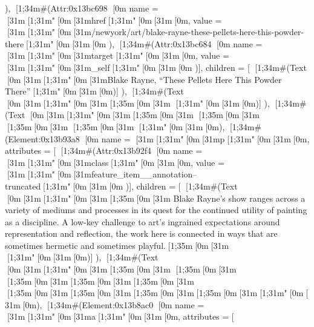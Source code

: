 {{{{{{{                          }),
                        [1;34m#(Attr:0x13bc698 {[0m
                          name = [31m[1;31m"[0m[31mhref[1;31m"[0m[31m[0m,
                          value = [31m[1;31m"[0m[31m/newyork/art/blake-rayne-these-pellets-here-this-powder-there[1;31m"[0m[31m[0m
                          }),
                        [1;34m#(Attr:0x13bc684 {[0m name = [31m[1;31m"[0m[31mtarget[1;31m"[0m[31m[0m, value = [31m[1;31m"[0m[31m_self[1;31m"[0m[31m[0m })],
                      children = [ [1;34m#(Text [0m[31m[1;31m"[0m[31mBlake Rayne, “These Pellets Here This Powder There”[1;31m"[0m[31m[0m)]
                      }),
                    [1;34m#(Text [0m[31m[1;31m"[0m[31m[1;35m\n[0m[31m                                        [1;31m"[0m[31m[0m)]
                  }),
                [1;34m#(Text [0m[31m[1;31m"[0m[31m[1;35m\n[0m[31m                [1;35m\n[0m[31m                                                                    [1;35m\n[0m[31m                                                [1;35m\n[0m[31m                                                                            [1;31m"[0m[31m[0m),
                [1;34m#(Element:0x13b93a8 {[0m
                  name = [31m[1;31m"[0m[31mp[1;31m"[0m[31m[0m,
                  attributes = [
                    [1;34m#(Attr:0x13b92f4 {[0m
                      name = [31m[1;31m"[0m[31mclass[1;31m"[0m[31m[0m,
                      value = [31m[1;31m"[0m[31mfeature_item__annotation--truncated[1;31m"[0m[31m[0m
                      })],
                  children = [
                    [1;34m#(Text [0m[31m[1;31m"[0m[31m[1;35m\n[0m[31m                            Blake Rayne’s show ranges across a variety of mediums and processes in its quest for the continued utility of painting as a discipline. A low-key challenge to art’s ingrained expectations around representation and reflection, the work here is connected in ways that are sometimes hermetic and sometimes playful.[1;35m\n[0m[31m                        [1;31m"[0m[31m[0m)]
                  }),
                [1;34m#(Text [0m[31m[1;31m"[0m[31m[1;35m\n[0m[31m                                    [1;35m\n[0m[31m                [1;35m\t[0m[31m[1;35m\t[0m[31m[1;35m\t[0m[31m    [1;35m\t[0m[31m[1;35m\t[0m[31m[1;35m\t[0m[31m[1;35m\t[0m[31m[1;31m"[0m[31m[0m),
                [1;34m#(Element:0x13b8ac0 {[0m
                  name = [31m[1;31m"[0m[31ma[1;31m"[0m[31m[0m,
                  attributes = [
}}}}}
